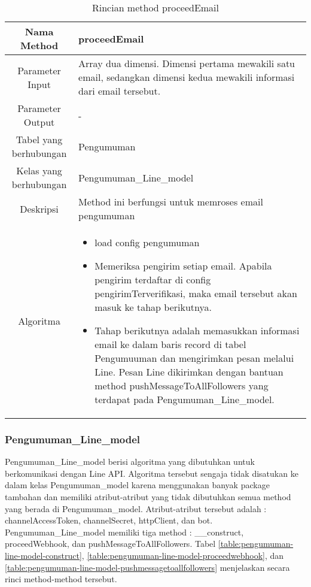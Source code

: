 \begin{center}
	\begin{table}[H]
	\caption{Rincian method proceedEmail}
	\label{table:pengumuman-model-proceedemail}
\begin{tabular}{|c|p{11cm}|}
\hline
Nama Method 	& 	 proceedEmail	\\
\hline
Parameter Input & Array dua dimensi. Dimensi pertama mewakili satu email, sedangkan dimensi kedua mewakili informasi dari email tersebut. \\
\hline
Parameter Output & - \\
\hline
Tabel yang berhubungan & Pengumuman \\
\hline
Kelas yang berhubungan &  Pengumuman\_Line\_model \\
\hline
Deskripsi	& Method ini berfungsi untuk memroses email pengumuman\\
\hline
Algoritma	& \begin{itemize}
				\item load config pengumuman
				\item Memeriksa pengirim setiap email. Apabila pengirim terdaftar di config pengirimTerverifikasi, maka email tersebut akan masuk ke tahap berikutnya.
				\item Tahap berikutnya adalah memasukkan informasi email ke dalam baris record di tabel Pengumuuman dan mengirimkan pesan melalui Line. Pesan Line dikirimkan dengan bantuan method pushMessageToAllFollowers yang terdapat pada Pengumuman\_Line\_model.
				\end{itemize} \\
\hline
\end{tabular}
\end{table}
\end{center}

\subsubsection{Pengumuman\_Line\_model}
Pengumuman\_Line\_model berisi algoritma yang dibutuhkan untuk berkomunikasi dengan Line API. Algoritma tersebut sengaja tidak disatukan ke dalam kelas Pengumuman\_model karena menggunakan banyak package tambahan dan memiliki atribut-atribut yang tidak dibutuhkan semua method yang berada di Pengumuman\_model. Atribut-atribut tersebut adalah : \textdollar channelAccessToken, \textdollar channelSecret, \textdollar httpClient, dan \textdollar bot. Pengumuman\_Line\_model memiliki tiga method : \_\_construct, proceedWebhook, dan pushMessageToAllFollowers. Tabel \ref{table:pengumuman-line-model-construct}, \ref{table:pengumuman-line-model-proceedwebhook}, dan \ref{table:pengumuman-line-model-pushmessagetoallfollowers} menjelaskan secara rinci method-method tersebut.

